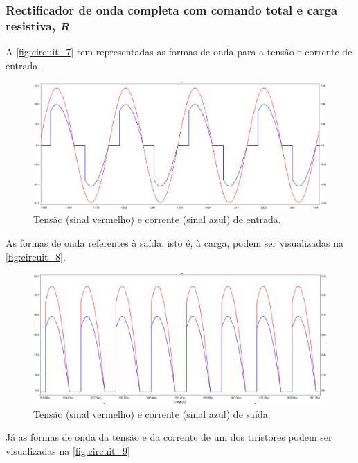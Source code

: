 \documentclass[a4paper,11pt]{article}
\numberwithin{equation}{section}
\begin{document}
\subsubsection{Rectificador de onda completa com comando total e carga resistiva, \textit{R}}

A \autoref{fig:circuit_7} tem representadas as formas de onda para a tensão e corrente de entrada.

\begin{figure}[h]
	\centering
	\includegraphics[keepaspectratio=true, scale=0.4]{img/circuito5}
	\caption{Tensão (sinal vermelho) e corrente (sinal azul) de entrada.}
	\label{fig:circuit_7}
	\vspace{-0.8em}
\end{figure}

\pagebreak
As formas de onda referentes à saída, isto é, à carga, podem ser visualizadas na \autoref{fig:circuit_8}.

\begin{figure}[h]
	\centering
	\includegraphics[keepaspectratio=true, scale=0.4]{img/circuito6}
	\caption{Tensão (sinal vermelho) e corrente (sinal azul) de saída.}
	\label{fig:circuit_8}
	\vspace{-0.8em}
\end{figure}

Já as formas de onda da tensão e da corrente de um dos tirístores podem ser visualizadas na \autoref{fig:circuit_9}
\end{document}
